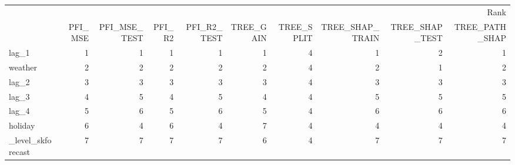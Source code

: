 \begin{tabular}{lrrrrrrrrr}
\toprule
 & \multicolumn{9}{r}{Rank} \\
 & PFI_MSE & PFI_MSE_TEST & PFI_R2 & PFI_R2_TEST & TREE_GAIN & TREE_SPLIT & TREE_SHAP_TRAIN & TREE_SHAP_TEST & TREE_PATH_SHAP \\
\midrule
lag_1 & 1 & 1 & 1 & 1 & 1 & 4 & 1 & 2 & 1 \\
weather & 2 & 2 & 2 & 2 & 2 & 4 & 2 & 1 & 2 \\
lag_2 & 3 & 3 & 3 & 3 & 3 & 4 & 3 & 3 & 3 \\
lag_3 & 4 & 5 & 4 & 5 & 4 & 4 & 5 & 5 & 5 \\
lag_4 & 5 & 6 & 5 & 6 & 5 & 4 & 6 & 6 & 6 \\
holiday & 6 & 4 & 6 & 4 & 7 & 4 & 4 & 4 & 4 \\
_level_skforecast & 7 & 7 & 7 & 7 & 6 & 4 & 7 & 7 & 7 \\
\bottomrule
\end{tabular}
